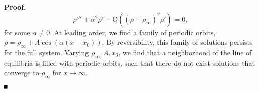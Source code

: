 \documentclass[10pt]{article}
\newenvironment{Proof}%
 {\begin{trivlist} \item[]{\bf Proof. }}%
 {\hspace*{\fill}$\rule{.4\baselineskip}{.4\baselineskip}$\end{trivlist}}
\newcommand{\rmO}{\mathrm{O}}
\begin{document}
\begin{Proof}
\[\rho'''+\alpha^2\rho'+\rmO\left((\rho-\rho_\infty)^2\rho'\right)=0,                                                                                                                                                                                                                                                                                                                                                                                                                                                                                                                                                                                                                                                                                                                                                                                                                                                                                                                                                                                                                                                                                                                                                                                                                                                                                                                                                                                                                                                                                                                                                                                                                                                                                                                                                                                                                                                                                                                                                                                                                                                                                                                                                                                                                                                                                                                                                                                                                                                  \]
for some $\alpha\neq 0$. At leading order, we find a family of periodic orbits, $\rho=\rho_\infty + A\cos(\alpha (x-x_0))$. By reversibility, this family of solutions persists for the full system. Varying $\rho_\infty,A,x_0$, we find that a neighborhood of the line of equilibria is filled with periodic orbits, such that there do not exist solutions that converge to $\rho_\infty$ for $x\to\infty$. 

\end{Proof}
\end{document}
